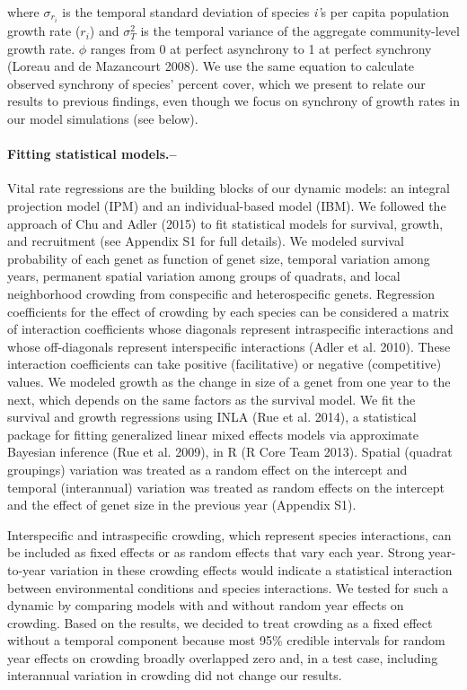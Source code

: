 \documentclass[12pt,]{article}
\begin{document}
\noindent where \(\sigma_{r_{i}}\) is the temporal
standard deviation of species \emph{i'}s per capita
population growth rate (\(r_i\)) and \(\sigma^{2}_{T}\) is the temporal
variance of the aggregate community-level growth rate. \(\phi\) ranges
from 0 at perfect asynchrony to 1 at perfect synchrony (Loreau and {{de
Mazancourt}} 2008). We use the same equation to calculate observed
synchrony of species' percent cover, which we present to relate our
results to previous findings, even though we focus on synchrony of
growth rates in our model simulations (see below).

\paragraph{Fitting statistical
models.--}\label{fitting-statistical-models.}

Vital rate regressions are the building blocks of our dynamic models: an
integral projection model (IPM) and an individual-based model (IBM). We
followed the approach of Chu and Adler (2015) to fit statistical models
for survival, growth, and recruitment (see Appendix S1 for full
details). We modeled survival probability of each genet as function of
genet size, temporal variation among years, permanent spatial variation
among groups of quadrats, and local neighborhood crowding from
conspecific and heterospecific genets. Regression coefficients for the
effect of crowding by each species can be considered a matrix of
interaction coefficients whose diagonals represent intraspecific
interactions and whose off-diagonals represent interspecific
interactions (Adler et al. 2010). These interaction coefficients can
take positive (facilitative) or negative (competitive) values. We
modeled growth as the change in size of a genet from one year to the
next, which depends on the same factors as the survival model. We fit
the survival and growth regressions using INLA (Rue et al. 2014), a
statistical package for fitting generalized linear mixed effects models
via approximate Bayesian inference (Rue et al. 2009), in R (R Core Team
2013). Spatial (quadrat groupings) variation was treated as a random
effect on the intercept and temporal (interannual) variation was treated
as random effects on the intercept and the effect of genet size in the
previous year (Appendix S1).

Interspecific and intraspecific crowding, which represent species interactions, can be included as fixed effects or as random effects that vary each year.
Strong year-to-year variation in these crowding effects would indicate a statistical interaction between environmental conditions and species interactions.
We tested for such a dynamic by comparing models with and without random year effects on crowding.
Based on the results, we decided to treat crowding as a fixed effect without a temporal component because most 95\% credible intervals for random year effects on crowding broadly overlapped zero and, in a test case, including interannual variation in crowding did not change our results.
\end{document}

